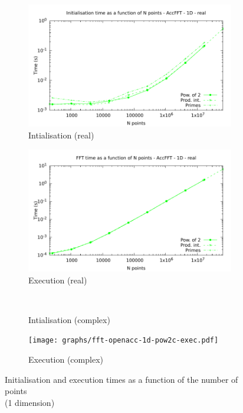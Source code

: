 \documentclass[12pt, a4paper]{article}
\begin{document}
\begin{figure}[H]
\captionsetup{width=0.8\linewidth}
\centering
\begin{subfigure}{.5\textwidth}
\centering
\includegraphics[width=.9\linewidth]{graphs/fft-openacc-1d-pow2-r-init.pdf}
\caption{Intialisation (real)}
\label{FFTACC1DRI}
\end{subfigure}%
\begin{subfigure}{.5\textwidth}
\centering
\includegraphics[width=.9\linewidth]{graphs/fft-openacc-1d-pow2-r-exec.pdf}
\caption{Execution (real)}
\label{FFTACC1DRE}
\end{subfigure}\\
\begin{subfigure}{.5\textwidth}
\centering
\caption{Intialisation (complex)}
\label{FFTACC1DCI}
\end{subfigure}%
\begin{subfigure}{.5\textwidth}
\centering
\texttt{[image: graphs/fft-openacc-1d-pow2c-exec.pdf]}
\caption{Execution (complex)}
\label{FFTACC1DCE}
\end{subfigure}
\caption{Initialisation and execution times as a function of the number of points\\(1 dimension)}
\label{FFTCL1D}
\end{figure}
\end{document}
